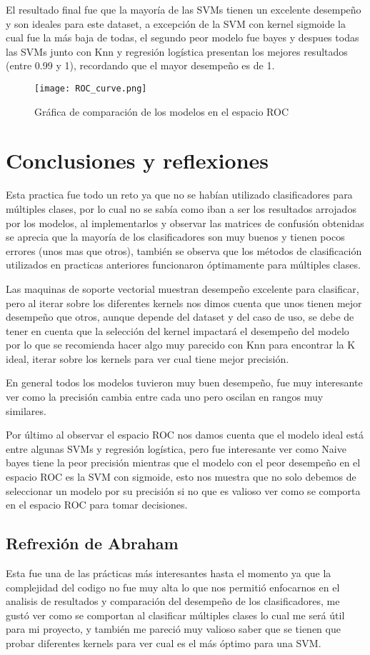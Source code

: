 \documentclass[sigconf,authorversion,nonacm]{acmart}
\begin{document}
El resultado final fue que la mayoría de las SVMs tienen un excelente desempeño y son ideales para este dataset, a excepción de la SVM con kernel sigmoide la cual fue la más baja de todas, el segundo peor modelo fue bayes y despues todas las SVMs junto con Knn y regresión logística presentan los mejores resultados (entre 0.99 y 1), recordando que el mayor desempeño es de 1.
\begin{figure}[H]
  \centering
  \texttt{[image: ROC\_curve.png]}
  \caption{Gráfica de comparación de los modelos en el espacio ROC}
\end{figure}

\section{Conclusiones y reflexiones}
Esta practica fue todo un reto ya que no se habían utilizado clasificadores para múltiples clases, por lo cual no se sabía como iban a ser los resultados arrojados por los modelos, al implementarlos y observar las matrices de confusión obtenidas se aprecia que la mayoría de los clasificadores son muy buenos y tienen pocos errores (unos mas que otros), también se observa que los métodos de clasificación utilizados en practicas anteriores funcionaron óptimamente para múltiples clases.

Las maquinas de soporte vectorial muestran desempeño excelente para clasificar, pero al iterar sobre los diferentes kernels nos dimos cuenta que unos tienen mejor desempeño que otros, aunque depende del dataset y del caso de uso, se debe de tener en cuenta que la selección del kernel impactará el desempeño del modelo por lo que se recomienda hacer algo muy parecido con Knn para encontrar la K ideal, iterar sobre los kernels para ver cual tiene mejor precisión.

En general todos los modelos tuvieron muy buen desempeño, fue muy interesante ver como la precisión cambia entre cada uno pero oscilan en rangos muy similares.

Por último al observar el espacio ROC nos damos cuenta que el modelo ideal está entre algunas SVMs y regresión logística, pero fue interesante ver como Naive bayes tiene la peor precisión mientras que el modelo con el peor desempeño en el espacio ROC es la SVM con sigmoide, esto nos muestra que no solo debemos de seleccionar un modelo por su precisión si no que es valioso ver como se comporta en el espacio ROC para tomar decisiones.

\subsection{Refrexión de Abraham}
Esta fue una de las prácticas más interesantes hasta el momento ya que la complejidad del codigo no fue muy alta lo que nos permitió enfocarnos en el analisis de resultados y comparación del desempeño de los clasificadores, me gustó ver como se comportan al clasificar múltiples clases lo cual me será útil para mi proyecto, y también me pareció muy valioso saber que se tienen que probar diferentes kernels para ver cual es el más óptimo para una SVM.
\end{document}
